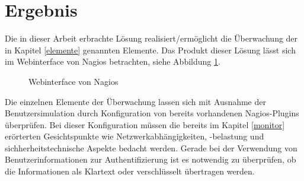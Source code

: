 \section{Ergebnis}

Die in dieser Arbeit erbrachte Lösung realisiert/ermöglicht die Überwachung der in Kapitel \ref{elemente} genannten Elemente.
Das Produkt dieser Lösung lässt sich im Webinterface von Nagios betrachten, siehe Abbildung \ref{nweb}.


\begin{figure}[ht]
	\centering
		\caption{Webinterface von Nagios}
		\label{nweb}
\end{figure}

Die einzelnen Elemente der Überwachung lassen sich mit Ausnahme der Benutzersimulation durch Konfiguration von bereits vorhandenen Nagios-Plugins überprüfen.
Bei dieser Konfiguration müssen die bereits im Kapitel \ref{monitor} erörterten Gesichtspunkte wie Netzwerkabhängigkeiten, -belastung und sichherheitstechnische Aspekte bedacht werden.
Gerade bei der Verwendung von Benutzerinformationen zur Authentifizierung ist es notwendig zu überprüfen, ob die Informationen als Klartext oder verschlüsselt übertragen werden.\\

